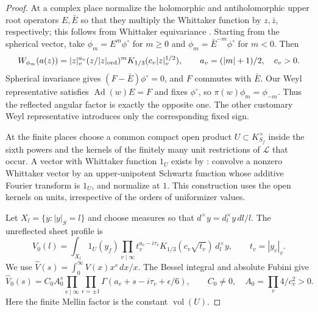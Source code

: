 \documentclass[11pt,a4paper]{article}
\numberwithin{equation}{section}
\theoremstyle{definition}
\theoremstyle{remark}
\begin{document}
\begin{proof}
At a complex place normalize the holomorphic and antiholomorphic upper
root operators $E,\bar E$ so that they multiply the Whittaker function by
$z,\bar z$, respectively; this follows from Whittaker equivariance
\cite[(5.10)]{P}.  Starting from the spherical vector, take
$\phi_m=E^m\phi^\circ$ for $m\ge0$ and
$\phi_m=\bar E^{-m}\phi^\circ$ for $m<0$.  Then
\begin{equation}\label{eq:higher-ktype}
 W_{\phi_m}(a(z))=|z|_v^{a_v}(z/|z|_{\rm ord})^m
                    K_{1/3}(c_v|z|_v^{1/2}),
 \qquad a_v=(|m|+1)/2,\quad c_v>0.
\end{equation}
Spherical invariance gives $(F-\bar E)\phi^\circ=0$, and $F$ commutes
with $\bar E$.  Our Weyl representative satisfies
$\operatorname{Ad}(w)E=F$ and fixes $\phi^\circ$, so
$\pi(w)\phi_m=\phi_{-m}$.  Thus the reflected angular factor is exactly
the opposite one.  The other customary Weyl representative introduces
only the corresponding fixed sign.

At the finite places choose a common compact open product
$U\subset K_{S_f}^\times$ inside the sixth powers and the kernels of the
finitely many unit restrictions of $\mathcal L$ that occur.  A vector
with Whittaker function $1_U$ exists by \cite[Lemma~5.3]{P}: convolve a
nonzero Whittaker vector by an upper-unipotent Schwartz function whose
additive Fourier transform is $1_U$, and normalize at $1$.
This construction uses the open kernels on units, irrespective of the
orders of uniformizer values.

Let $X_l=\{y:|y|_S=l\}$ and choose measures so that
$d^\times y=d_l^\times y\,dl/l$.  The unreflected sheet profile is
\[
 V_0(l)=\int_{X_l}1_U(y_f)
       \prod_{v\mid\infty}t_v^{a_v-i\tau_v}
                         K_{1/3}(c_v\sqrt{t_v})\,d_l^\times y,
 \qquad t_v=|y_v|_v.
\]
We use $\widehat V(s)=\int_0^\infty V(x)x^s\,dx/x$.
The Bessel integral and absolute Fubini give
\begin{equation}\label{eq:theta-direct-mellin}
 \widehat V_0(s)=C_0A_0^s
       \prod_{v\mid\infty}\prod_{\epsilon=\pm1}
        \Gamma(a_v+s-i\tau_v+\epsilon/6),
 \qquad C_0\ne0,\quad A_0=\prod_v4/c_v^2>0.
\end{equation}
Here the finite Mellin factor is the constant $\operatorname{vol}(U)$.


\end{proof}
\end{document}
